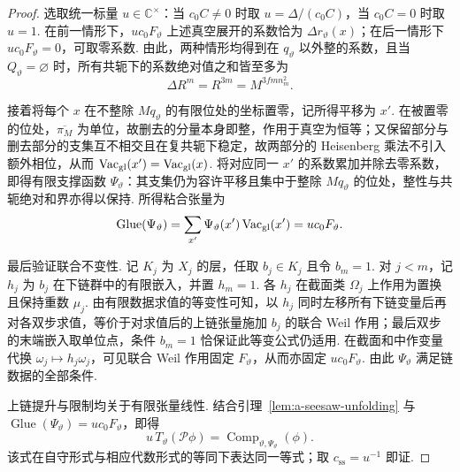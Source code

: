 \begin{proof}
选取统一标量 $u\in\mathbb C^\times$：当 $c_0C\ne0$ 时取 $u=\Delta/(c_0C)$，当 $c_0C=0$ 时取 $u=1$. 在前一情形下，$u c_0F_\vartheta$ 上述真空展开的系数恰为 $\Delta r_\vartheta(x)$；在后一情形下 $u c_0F_\vartheta=0$，可取零系数. 由此，两种情形均得到在 $q_\vartheta$ 以外整的系数，且当 $Q_\vartheta=\varnothing$ 时，所有共轭下的系数绝对值之和皆至多为
\[
 \Delta R^m=R^{3m}=M^{3fm n_m^2}.
\]

接着将每个 $x$ 在不整除 $M q_\vartheta$ 的有限位处的坐标置零，记所得平移为 $x'$. 在被置零的位处，$\overline{\pi_M}$ 为单位，故删去的分量本身即整，作用于真空为恒等；又保留部分与删去部分的支集互不相交且在复共轭下稳定，故两部分的 Heisenberg 乘法不引入额外相位，从而 $\operatorname{Vac}_{\rm gl}(x')=\operatorname{Vac}_{\rm gl}(x)$. 将对应同一 $x'$ 的系数累加并除去零系数，即得有限支撑函数 $\Psi_\vartheta$：其支集仍为容许平移且集中于整除 $M q_\vartheta$ 的位处，整性与共轭绝对和界亦得以保持. 所得粘合张量为
\[
 \operatorname{Glue}(\Psi_\vartheta)
 =\sum_{x'}\Psi_\vartheta(x')\operatorname{Vac}_{\rm gl}(x')
 =u c_0F_\vartheta.
\]

最后验证联合不变性. 记 $K_j$ 为 $X_j$ 的层，任取 $b_j\in K_j$ 且令 $b_m=1$. 对 $j<m$，记 $h_j$ 为 $b_j$ 在下链群中的有限嵌入，并置 $h_m=1$. 各 $h_j$ 在截面类 $\Omega_j$ 上作用为置换且保持重数 $\mu_j$. 由有限数据求值的等变性可知，以 $h_j$ 同时左移所有下链变量后再对各双步求值，等价于对求值后的上链张量施加 $b_j$ 的联合 Weil 作用；最后双步的末端嵌入取单位点，条件 $b_m=1$ 恰保证此等变公式仍适用. 在截面和中作变量代换 $\omega_j\mapsto h_j\omega_j$，可见联合 Weil 作用固定 $F_\vartheta$，从而亦固定 $u c_0F_\vartheta$. 由此 $\Psi_\vartheta$ 满足链数据的全部条件.

上链提升与限制均关于有限张量线性. 结合引理~\ref{lem:a-seesaw-unfolding} 与 $\operatorname{Glue}(\Psi_\vartheta)=u c_0F_\vartheta$，即得
\[
 u\,T_\vartheta(\mathcal P\phi)=\operatorname{Comp}_{\vartheta,\Psi_\vartheta}(\phi).
\]
该式在自守形式与相应代数形式的等同下表达同一等式；取 $c_{\mathrm{ss}}=u^{-1}$ 即证.
\end{proof}

